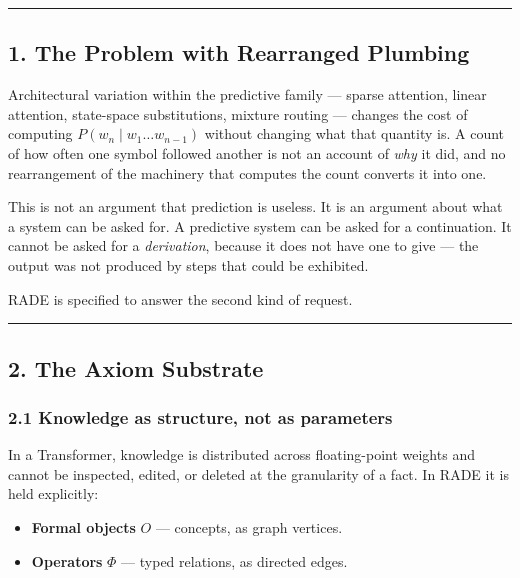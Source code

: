 \documentclass[
  11pt,
  a4paper,
]{article}
\providecommand{\tightlist}{%
  \setlength{\itemsep}{0pt}\setlength{\parskip}{0pt}}
\begin{document}
\begin{center}\rule{0.5\linewidth}{0.5pt}\end{center}

\subsection{1. The Problem with Rearranged
Plumbing}\label{the-problem-with-rearranged-plumbing}

Architectural variation within the predictive family --- sparse
attention, linear attention, state-space substitutions, mixture routing
--- changes the cost of computing \(P(w_n \mid w_1 \ldots w_{n-1})\)
without changing what that quantity is. A count of how often one symbol
followed another is not an account of \emph{why} it did, and no
rearrangement of the machinery that computes the count converts it into
one.

This is not an argument that prediction is useless. It is an argument
about what a system can be asked for. A predictive system can be asked
for a continuation. It cannot be asked for a \emph{derivation}, because
it does not have one to give --- the output was not produced by steps
that could be exhibited.

RADE is specified to answer the second kind of request.

\begin{center}\rule{0.5\linewidth}{0.5pt}\end{center}

\subsection{2. The Axiom Substrate}\label{the-axiom-substrate}

\subsubsection{2.1 Knowledge as structure, not as
parameters}\label{knowledge-as-structure-not-as-parameters}

In a Transformer, knowledge is distributed across floating-point weights
and cannot be inspected, edited, or deleted at the granularity of a
fact. In RADE it is held explicitly:

\begin{itemize}
\tightlist
\item
  \textbf{Formal objects} \(O\) --- concepts, as graph vertices.
\item
  \textbf{Operators} \(\Phi\) --- typed relations, as directed edges.
\end{itemize}
\end{document}
